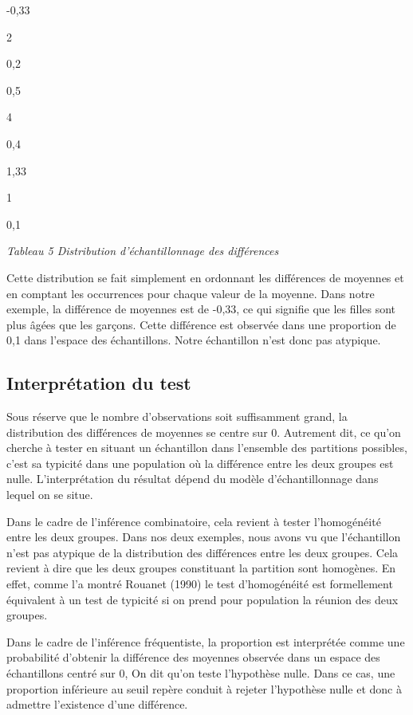 \documentclass[]{book}
\theoremstyle{definition}
\theoremstyle{definition}
\theoremstyle{definition}
\theoremstyle{remark}
\begin{document}
-0,33

2

0,2

0,5

4

0,4

1,33

1

0,1

\emph{Tableau 5 Distribution d'échantillonnage des différences}

Cette distribution se fait simplement en ordonnant les différences de
moyennes et en comptant les occurrences pour chaque valeur de la
moyenne. Dans notre exemple, la différence de moyennes est de -0,33, ce
qui signifie que les filles sont plus âgées que les garçons. Cette
différence est observée dans une proportion de 0,1 dans l'espace des
échantillons. Notre échantillon n'est donc pas atypique.

\hypertarget{interpretation-du-test-1}{%
\subsection{Interprétation du test}\label{interpretation-du-test-1}}

Sous réserve que le nombre d'observations soit suffisamment grand, la
distribution des différences de moyennes se centre sur 0. Autrement dit,
ce qu'on cherche à tester en situant un échantillon dans l'ensemble des
partitions possibles, c'est sa typicité dans une population où la
différence entre les deux groupes est nulle. L'interprétation du
résultat dépend du modèle d'échantillonnage dans lequel on se situe.

Dans le cadre de l'inférence combinatoire, cela revient à tester
l'homogénéité entre les deux groupes. Dans nos deux exemples, nous avons
vu que l'échantillon n'est pas atypique de la distribution des
différences entre les deux groupes. Cela revient à dire que les deux
groupes constituant la partition sont homogènes. En effet, comme l'a
montré Rouanet (1990) le test d'homogénéité est formellement équivalent
à un test de typicité si on prend pour population la réunion des deux
groupes.

Dans le cadre de l'inférence fréquentiste, la proportion est interprétée
comme une probabilité d'obtenir la différence des moyennes observée dans
un espace des échantillons centré sur 0, On dit qu'on teste l'hypothèse
nulle. Dans ce cas, une proportion inférieure au seuil repère conduit à
rejeter l'hypothèse nulle et donc à admettre l'existence d'une
différence.
\end{document}
